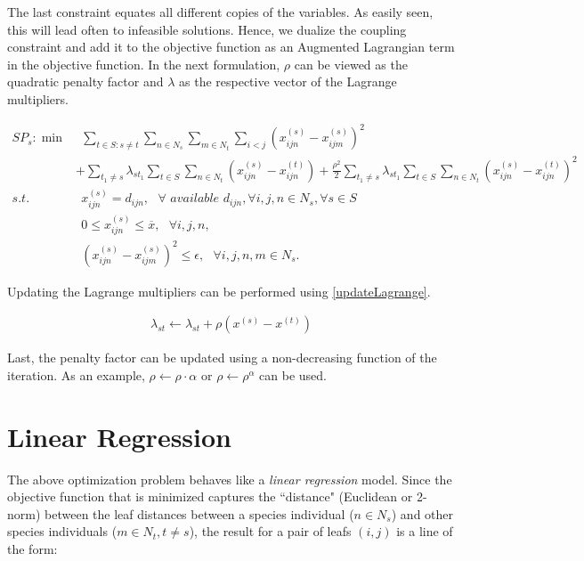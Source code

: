 \documentclass[12pt]{amsart}
\begin{document}
The last constraint equates all different copies of the variables. As easily seen, this will lead often to infeasible solutions. Hence, we dualize the coupling constraint and add it to the objective function as an Augmented Lagrangian term in the objective function. In the next formulation, $\rho$ can be viewed as the quadratic penalty factor and $\lambda$ as the respective vector of the Lagrange multipliers. 

\begin{align}
	SP_s: \min &~~ \sum\limits_{t\in S: s\neq t} \sum\limits_{n\in N_s} \sum\limits_{m\in N_t} \sum\limits_{i<j} (x^{(s)}_{ijn}-x^{(s)}_{ijm})^2 \\
	\nonumber ~~&+\sum\limits_{t_1\neq s}\lambda_{st_1} \sum\limits_{t\in S}\sum\limits_{n\in N_t} (x^{(s)}_{ijn} - x^{(t)} _{ijn}) + \frac{\rho^2}{2}\sum\limits_{t_1\neq s}\lambda_{st_1} \sum\limits_{t\in S}\sum\limits_{n\in N_t} (x^{(s)}_{ijn} - x^{(t)}_{ijn})^2 \\
	s.t. &~~ x^{(s)}_{ijn} = d_{ijn}, ~~~ \forall \textit{ available } d_{ijn}, \forall i,j,n\in N_s, \forall s\in S \\
	&~~ 0\leq x^{(s)}_{ijn}\leq \overline{x}, ~~~\forall i,j,n, \\
	\label{EpsilonConstraint}
	&~~ (x^{(s)}_{ijn}-x^{(s)}_{ijm})^2 \leq \epsilon, ~~~ \forall i,j, n,m\in N_s.
\end{align}

Updating the Lagrange multipliers can be performed using \eqref{updateLagrange}. 

\begin{align}
	\label{updateLagrange}
	\lambda_{st} \leftarrow \lambda_{st} + \rho(x^{(s)}-x^{(t)})
\end{align}

Last, the penalty factor can be updated using a non-decreasing function of the iteration. As an example, $\rho\leftarrow\rho\cdot\alpha$ or $\rho\leftarrow\rho^\alpha$ can be used. 

\section{Linear Regression}

The above optimization problem behaves like a \emph{linear regression} model. Since the objective function that is minimized captures the ``distance" (Euclidean or 2-norm) between the leaf distances between a species individual ($n\in N_s$) and other species individuals ($m\in N_t, t\neq s$), the result for a pair of leafs $(i, j)$ is a line of the form:
\end{document}
